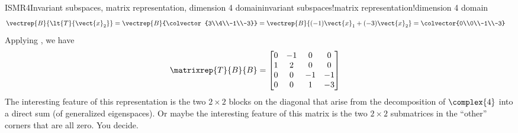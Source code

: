 \begin{example}{ISMR4}{Invariant subspaces, matrix representation, dimension 4 domain}{invariant subspaces!matrix representation!dimension 4 domain}
\begin{align*}
%
\vectrep{B}{\lt{T}{\vect{x}_2}}
&=\vectrep{B}{\colvector{3\\4\\-1\\-3}}
=\vectrep{B}{(-1)\vect{x}_1+(-3)\vect{x}_2}
=\colvector{0\\0\\-1\\-3}
%
\end{align*}
%
Applying , we have
%
\begin{align*}
\matrixrep{T}{B}{B}&=
\begin{bmatrix}
0 & -1 & 0 & 0 \\
1 & 2 & 0 & 0 \\
0 & 0 & -1 & -1 \\
0 & 0 &  1 & -3
\end{bmatrix}
\end{align*}
%
The interesting feature of this representation is the two $2\times 2$ blocks on the diagonal that arise from the decomposition of $\complex{4}$ into a direct sum (of generalized eigenspaces).  Or maybe the interesting feature of this matrix is the two $2\times 2$ submatrices in the ``other'' corners that are all zero.  You decide.
%
\end{example}
%
%
